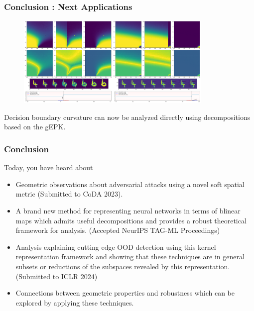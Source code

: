 \begin{frame}
  \frametitle{Conclusion : Next Applications}
\begin{figure}[ht!]
    \centering
    \includegraphics[width=0.42\textwidth]{c5_figures/stab-mnist-C32-50-50-10-0.001-eval-1e-06-none-4-6-db_interp-stability-50.png}\includegraphics[width=0.42\textwidth]{c5_figures/stab-mnist-C32-50-50-10-0.001-eval-1e-06-pgd-4-6-db_interp-stability-50.png}

\end{figure}

Decision boundary curvature can now be analyzed directly using
decompositions based on the gEPK. 
\end{frame}

\begin{frame}
  \frametitle{Conclusion}
  Today, you have heard about
  \begin{itemize}
  \item Geometric observations about adversarial attacks using a novel
    soft spatial metric (Submitted to CoDA 2023).
  \item A brand new method for representing neural networks in terms
    of blinear maps which admits useful decompositions and provides a
    robust theoretical framework for analysis. (Accepted NeurIPS
    TAG-ML Proceedings)
    \item Analysis explaining cutting edge OOD detection using this
      kernel representation framework and showing that these
      techniques are in general subsets or reductions of the subspaces
      revealed by this representation. (Submitted to ICLR 2024)
      \item Connections between geometric properties and robustness
        which can be explored by applying these techniques. 
\end{itemize}
\end{frame}

